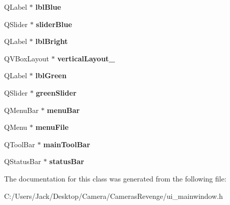 \begin{DoxyCompactItemize}
\item 
\hypertarget{class_ui___main_window_a79e96d86e58f00c06ffe9b145a32fee3}{Q\+Label $\ast$ {\bfseries lbl\+Blue}}\label{class_ui___main_window_a79e96d86e58f00c06ffe9b145a32fee3}

\item 
\hypertarget{class_ui___main_window_accad03b7bebce2e7e74d19804b3977ea}{Q\+Slider $\ast$ {\bfseries slider\+Blue}}\label{class_ui___main_window_accad03b7bebce2e7e74d19804b3977ea}

\item 
\hypertarget{class_ui___main_window_ae9f07f1030ac1066f50147f6ff426552}{Q\+Label $\ast$ {\bfseries lbl\+Bright}}\label{class_ui___main_window_ae9f07f1030ac1066f50147f6ff426552}

\item 
\hypertarget{class_ui___main_window_a6f40fc110b15410c00837a446d57bdbe}{Q\+V\+Box\+Layout $\ast$ {\bfseries vertical\+Layout\+\_}}\label{class_ui___main_window_a6f40fc110b15410c00837a446d57bdbe}

\item 
\hypertarget{class_ui___main_window_a4b200faf47a8a0c1993a59e8dfc2b982}{Q\+Label $\ast$ {\bfseries lbl\+Green}}\label{class_ui___main_window_a4b200faf47a8a0c1993a59e8dfc2b982}

\item 
\hypertarget{class_ui___main_window_a06898c594467554c9e1b63e1268e8c48}{Q\+Slider $\ast$ {\bfseries green\+Slider}}\label{class_ui___main_window_a06898c594467554c9e1b63e1268e8c48}

\item 
\hypertarget{class_ui___main_window_a2be1c24ec9adfca18e1dcc951931457f}{Q\+Menu\+Bar $\ast$ {\bfseries menu\+Bar}}\label{class_ui___main_window_a2be1c24ec9adfca18e1dcc951931457f}

\item 
\hypertarget{class_ui___main_window_a7ba84cb4cdd6a12dc83bf4e100bd8d80}{Q\+Menu $\ast$ {\bfseries menu\+File}}\label{class_ui___main_window_a7ba84cb4cdd6a12dc83bf4e100bd8d80}

\item 
\hypertarget{class_ui___main_window_a5172877001c8c7b4e0f6de50421867d1}{Q\+Tool\+Bar $\ast$ {\bfseries main\+Tool\+Bar}}\label{class_ui___main_window_a5172877001c8c7b4e0f6de50421867d1}

\item 
\hypertarget{class_ui___main_window_a50fa481337604bcc8bf68de18ab16ecd}{Q\+Status\+Bar $\ast$ {\bfseries status\+Bar}}\label{class_ui___main_window_a50fa481337604bcc8bf68de18ab16ecd}

\end{DoxyCompactItemize}


The documentation for this class was generated from the following file\+:\begin{DoxyCompactItemize}
\item 
C\+:/\+Users/\+Jack/\+Desktop/\+Camera/\+Cameras\+Revenge/ui\+\_\+mainwindow.\+h\end{DoxyCompactItemize}
